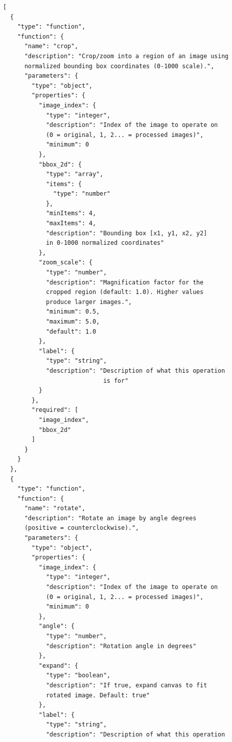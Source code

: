 \documentclass[runningheads]{llncs}
\theoremstyle{plain}
\theoremstyle{definition}
\theoremstyle{remark}
\begin{document}
\begin{tcolorbox}[
    enhanced,
    breakable,
    colframe=black!70,
    colback=yellow!5,
    boxrule=1pt, arc=4mm,
    left=2mm, right=2mm, top=1mm, bottom=1mm,
    before=\needspace{8\baselineskip},
    title={OpenAI-compatible schema: Geometric \& Spatial Tools}
]
\begin{verbatim}
[
  {
    "type": "function",
    "function": {
      "name": "crop",
      "description": "Crop/zoom into a region of an image using
      normalized bounding box coordinates (0-1000 scale).",
      "parameters": {
        "type": "object",
        "properties": {
          "image_index": {
            "type": "integer",
            "description": "Index of the image to operate on
            (0 = original, 1, 2... = processed images)",
            "minimum": 0
          },
          "bbox_2d": {
            "type": "array",
            "items": {
              "type": "number"
            },
            "minItems": 4,
            "maxItems": 4,
            "description": "Bounding box [x1, y1, x2, y2]
            in 0-1000 normalized coordinates"
          },
          "zoom_scale": {
            "type": "number",
            "description": "Magnification factor for the
            cropped region (default: 1.0). Higher values
            produce larger images.",
            "minimum": 0.5,
            "maximum": 5.0,
            "default": 1.0
          },
          "label": {
            "type": "string",
            "description": "Description of what this operation
                            is for"
          }
        },
        "required": [
          "image_index",
          "bbox_2d"
        ]
      }
    }
  },
  {
    "type": "function",
    "function": {
      "name": "rotate",
      "description": "Rotate an image by angle degrees
      (positive = counterclockwise).",
      "parameters": {
        "type": "object",
        "properties": {
          "image_index": {
            "type": "integer",
            "description": "Index of the image to operate on
            (0 = original, 1, 2... = processed images)",
            "minimum": 0
          },
          "angle": {
            "type": "number",
            "description": "Rotation angle in degrees"
          },
          "expand": {
            "type": "boolean",
            "description": "If true, expand canvas to fit
            rotated image. Default: true"
          },
          "label": {
            "type": "string",
            "description": "Description of what this operation

\end{verbatim}
\end{tcolorbox}
\end{document}
